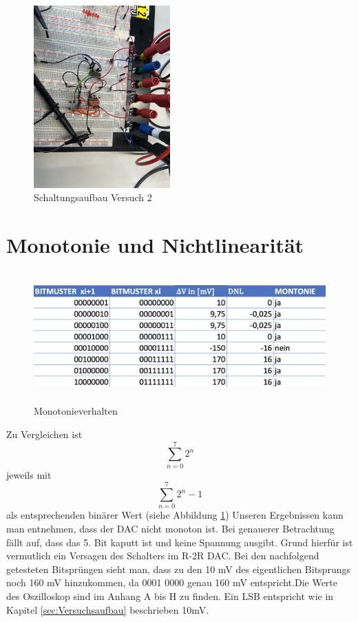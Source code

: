 \begin{figure}[H]
	\centering
	\includegraphics[height=7cm]{images/versuch2-schaltungsaufbau.jpeg} 
	\caption{Schaltungsaufbau Versuch 2}
\end{figure}



\section{Monotonie und Nichtlinearität}

\begin{figure}[H]
	\centering
	\includegraphics[height=5cm]{images/versuch2-monotonie-and-nichtlinearitaet.png} 
	\caption{Monotonieverhalten}
    \label{fig: Monotonieverhalten}
\end{figure}

Zu Vergleichen ist 
\[
\sum_{n=0}^{7} 2^n
\]
jeweils mit 
\[
\sum_{n=0}^{7} 2^n -1
\] als entsprechenden binärer Wert (siehe Abbildung \ref{fig: Monotonieverhalten})
Unseren Ergebnissen kann man entnehmen, dass der DAC nicht
monoton ist. Bei genauerer Betrachtung fällt auf, dass das 5.
Bit kaputt ist und keine Spannung ausgibt. Grund hierfür ist 
vermutlich ein Versagen des Schalters im R-2R DAC.
Bei den nachfolgend getesteten Bitsprüngen sieht man, dass zu den
10 mV des eigentlichen Bitsprungs noch 160 mV hinzukommen, da 0001 0000
genau 160 mV entspricht.Die Werte des Oszilloskop sind im Anhang A bis H zu finden.
Ein LSB entspricht wie in Kapitel \ref{sec:Versuchsaufbau} beschrieben 10mV.

